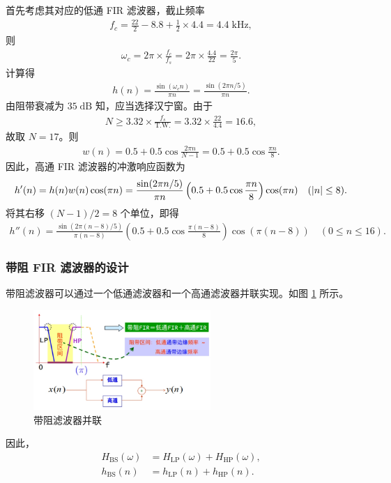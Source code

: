\begin{solution}
    首先考虑其对应的低通 FIR 滤波器，截止频率
    \begin{align*}
        f_c = \frac{22}{2} - 8.8 + \frac{1}{2} \times 4.4 = 4.4\;\mathrm{kHz},
    \end{align*}
    则
    \begin{align*}
        \omega_c = 2\pi \times \frac{f_c}{f_s} = 2\pi \times \frac{4.4}{22} = \frac{2\pi}{5}.
    \end{align*}
    计算得
    \begin{align*}
        h(n) = \frac{\sin(\omega_c n)}{\pi n} = \frac{\sin(2\pi n / 5)}{\pi n}.
    \end{align*}
    由阻带衰减为 $35\;\mathrm{dB}$ 知，应当选择汉宁窗。由于
    \begin{align*}
        N \ge 3.32 \times \frac{f_s}{\text{T.W.}} = 3.32 \times \frac{22}{4.4} = 16.6,
    \end{align*}
    故取 $N = 17$。则
    \begin{align*}
        w(n) = 0.5 + 0.5\cos\frac{2\pi n}{N - 1} = 0.5 + 0.5\cos\frac{\pi n}{8}.
    \end{align*}
    因此，高通 FIR 滤波器的冲激响应函数为
    \begin{align*}
        h'(n) = h(n) w(n) \cos(\pi n) = \frac{\sin(2\pi n / 5)}{\pi n} \left(0.5 + 0.5\cos\frac{\pi n}{8}\right) \cos(\pi n) \quad (\left|n\right| \le 8).
    \end{align*}
    将其右移 $(N - 1) / 2 = 8$ 个单位，即得
    \begin{align*}
        h''(n) = \frac{\sin(2\pi (n - 8) / 5)}{\pi (n - 8)} \left(0.5 + 0.5\cos\frac{\pi (n - 8)}{8}\right) \cos(\pi (n - 8)) \quad (0 \le n \le 16).
    \end{align*}
\end{solution}

\subsubsection{带阻 FIR 滤波器的设计}

带阻滤波器可以通过一个低通滤波器和一个高通滤波器并联实现。如图 \ref{fig:band-stop-filter-parallel} 所示。
\begin{figure}[H]
    \centering
    \includegraphics[width=0.6\textwidth]{chap4/img/band_stop_filter_parallel.png}
    \caption{带阻滤波器并联}
    \label{fig:band-stop-filter-parallel}
\end{figure}
因此，
\begin{align*}
    H_{\text{BS}}(\omega) & = H_{\text{LP}}(\omega) + H_{\text{HP}}(\omega), \\
    h_{\text{BS}}(n) & = h_{\text{LP}}(n) + h_{\text{HP}}(n).
\end{align*}
